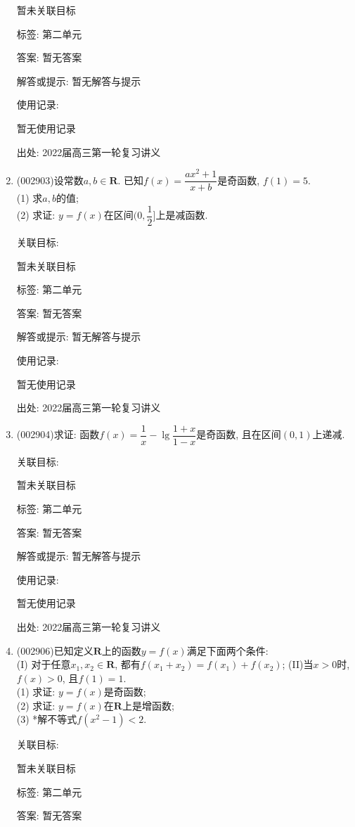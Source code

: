 \documentclass[10pt,a4paper]{article}
\begin{document}
\begin{enumerate}[1.]
暂未关联目标



标签: 第二单元

答案: 暂无答案

解答或提示: 暂无解答与提示

使用记录:

暂无使用记录


出处: 2022届高三第一轮复习讲义
\item { (002903)}设常数$a,b\in \mathbf{R}$. 已知$f(x)=\dfrac{ax^2+1}{x+b}$是奇函数, $f(1)=5$.\\
(1) 求$a,b$的值;\\
(2) 求证: $y=f(x)$在区间$(0,\dfrac 12]$上是减函数.


关联目标:

暂未关联目标



标签: 第二单元

答案: 暂无答案

解答或提示: 暂无解答与提示

使用记录:

暂无使用记录


出处: 2022届高三第一轮复习讲义
\item { (002904)}求证: 函数$f(x)=\dfrac 1x-\lg\dfrac{1+x}{1-x}$是奇函数, 且在区间$(0,1)$上递减.


关联目标:

暂未关联目标



标签: 第二单元

答案: 暂无答案

解答或提示: 暂无解答与提示

使用记录:

暂无使用记录


出处: 2022届高三第一轮复习讲义
\item { (002906)}已知定义$\mathbf{R}$上的函数$y=f(x)$满足下面两个条件:\\
(I) 对于任意$x_1,x_2\in \mathbf{R}$, 都有$f(x_1+x_2)=f(x_1)+f(x_2)$; (II)当$x>0$时, $f(x)>0$, 且$f(1)=1$.\\
(1) 求证: $y=f(x)$是奇函数;\\
(2) 求证: $y=f(x)$在$\mathbf{R}$上是增函数;\\
(3) *解不等式$f(x^2-1)<2$.


关联目标:

暂未关联目标



标签: 第二单元

答案: 暂无答案


\end{enumerate}
\end{document}
